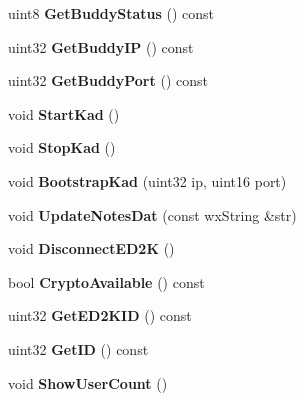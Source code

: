\begin{DoxyCompactItemize}
\item 
uint8 {\bfseries GetBuddyStatus} () const \label{classCamuleRemoteGuiApp_af6e0219260b138339a3255c7375f3e43}

\item 
uint32 {\bfseries GetBuddyIP} () const \label{classCamuleRemoteGuiApp_ad63926a74108bdb1338082aafdfbe17a}

\item 
uint32 {\bfseries GetBuddyPort} () const \label{classCamuleRemoteGuiApp_abe4cc9253d4dfda0b4ef5b61be6d2f64}

\item 
void {\bfseries StartKad} ()\label{classCamuleRemoteGuiApp_a569a5d1d5f749b86152c9ed57fb4bdb4}

\item 
void {\bfseries StopKad} ()\label{classCamuleRemoteGuiApp_a9885c2427384597b157b830944527f8c}

\item 
void {\bf BootstrapKad} (uint32 ip, uint16 port)
\item 
void {\bf UpdateNotesDat} (const wxString \&str)
\item 
void {\bfseries DisconnectED2K} ()\label{classCamuleRemoteGuiApp_a4e8870a9fe70f6909ac799eef7c67813}

\item 
bool {\bfseries CryptoAvailable} () const \label{classCamuleRemoteGuiApp_a66ac568e9a7e784b84e864f671653eb5}

\item 
uint32 {\bfseries GetED2KID} () const \label{classCamuleRemoteGuiApp_a96cbe9e875790bb9131447b08d0f35b7}

\item 
uint32 {\bfseries GetID} () const \label{classCamuleRemoteGuiApp_acf59a77a67b2b494e70f166b9ab4076f}

\item 
void {\bfseries ShowUserCount} ()\label{classCamuleRemoteGuiApp_a90d0f99b4ea5cb36c337a8646d0b6494}

\end{DoxyCompactItemize}
